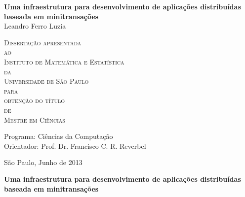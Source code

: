 \documentclass[11pt,twoside,a4paper]{book}
\begin{document}
\frontmatter 
\fancyhead[RO]{{\footnotesize\rightmark}\hspace{2em}\thepage}
\setcounter{tocdepth}{2}
\fancyhead[LE]{\thepage\hspace{2em}\footnotesize{\leftmark}}
\fancyhead[RE,LO]{}
\fancyhead[RO]{{\footnotesize\rightmark}\hspace{2em}\thepage}

\onehalfspacing

\thispagestyle{empty}
\begin{center}
    \vspace*{2.3cm}
    \textbf{\Large{Uma infraestrutura para desenvolvimento de aplicações distribuídas baseada em minitransações}}\\
    
    \vspace*{1.2cm}
    \Large{Leandro Ferro Luzia}
    
    \vskip 2cm
    \textsc{
    Dissertação apresentada\\[-0.25cm] 
    ao\\[-0.25cm]
    Instituto de Matemática e Estatística\\[-0.25cm]
    da\\[-0.25cm]
    Universidade de São Paulo\\[-0.25cm]
    para\\[-0.25cm]
    obtenção do título\\[-0.25cm]
    de\\[-0.25cm]
    Mestre em Ciências}
    
    \vskip 1.5cm
    Programa: Ciências da Computação\\
    Orientador: Prof. Dr. Francisco C. R. Reverbel
    \vskip 1cm
    
    \vskip 0.5cm
    \normalsize{São Paulo, Junho de 2013}
\end{center}

\newpage
\thispagestyle{empty}
    \begin{center}
        \vspace*{2.3 cm}
        \textbf{\Large{Uma infraestrutura para desenvolvimento de aplicações distribuídas baseada em minitransações}}\\
        \vspace*{2 cm}
    \end{center}
\end{document}
